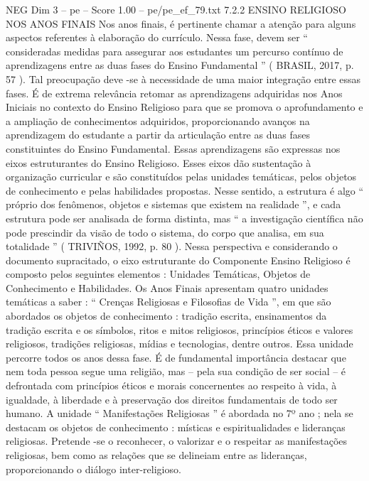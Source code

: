 \begin{textsample}{NEG Dim 3 – pe – Score 1.00 – pe/pe\_ef\_79.txt}  \label{ex:f3_neg_014}
7.2.2 ENSINO RELIGIOSO NOS ANOS FINAIS Nos anos finais, é pertinente chamar a atenção para alguns aspectos referentes à elaboração do currículo.
Nessa fase, devem ser “ consideradas medidas para assegurar aos estudantes um percurso contínuo de aprendizagens entre as duas fases do Ensino Fundamental ” ( BRASIL, 2017, p. 57 ).
Tal preocupação deve -se à necessidade de uma maior integração entre essas fases.
É de extrema relevância retomar as aprendizagens adquiridas nos Anos Iniciais no contexto do Ensino Religioso para que se promova o aprofundamento e a ampliação de conhecimentos adquiridos, proporcionando avanços na aprendizagem do estudante a partir da articulação entre as duas fases constituintes do Ensino Fundamental.
Essas aprendizagens são expressas nos eixos estruturantes do Ensino Religioso.
Esses eixos dão sustentação à organização curricular e são constituídos pelas unidades temáticas, pelos objetos de conhecimento e pelas habilidades propostas.
Nesse sentido, a estrutura é algo “ próprio dos fenômenos, objetos e sistemas que existem na realidade ”, e cada estrutura pode ser analisada de forma distinta, mas “ a investigação científica não pode prescindir da visão de todo o sistema, do corpo que analisa, em sua totalidade ” ( TRIVIÑOS, 1992, p. 80 ).
Nessa perspectiva e considerando o documento supracitado, o eixo estruturante do Componente Ensino Religioso é composto pelos seguintes elementos : Unidades Temáticas, Objetos de Conhecimento e Habilidades.
Os Anos Finais apresentam quatro unidades temáticas a saber : “ Crenças Religiosas e Filosofias de Vida ”, em que são abordados os objetos de conhecimento : tradição escrita, ensinamentos da tradição escrita e os símbolos, ritos e mitos religiosos, princípios éticos e valores religiosos, tradições religiosas, mídias e tecnologias, dentre outros.
Essa unidade percorre todos os anos dessa fase.
É de fundamental importância destacar que nem toda pessoa segue uma religião, mas – pela sua condição de ser social – é defrontada com princípios éticos e morais concernentes ao respeito à vida, à igualdade, à liberdade e à preservação dos direitos fundamentais de todo ser humano.
A unidade “ Manifestações Religiosas ” é abordada no 7º ano ; nela se destacam os objetos de conhecimento : místicas e espiritualidades e lideranças religiosas.
Pretende -se o reconhecer, o valorizar e o respeitar as manifestações religiosas, bem como as relações que se delineiam entre as lideranças, proporcionando o diálogo inter-religioso.

\end{textsample}
